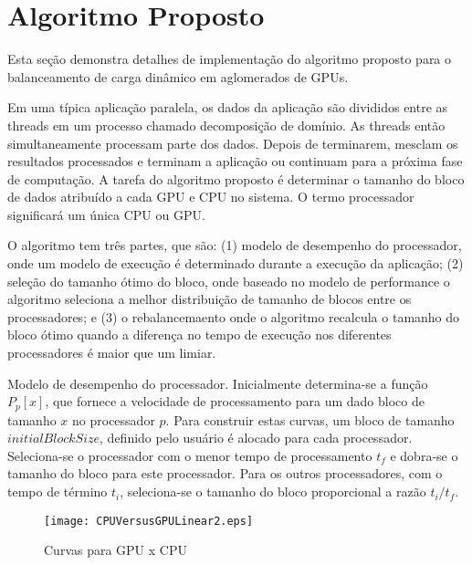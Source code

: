 \pagestyle{empty}
\cleardoublepage
\pagestyle{fancy}

\chapter{Algoritmo Proposto}\label{cap4}


Esta seção demonstra detalhes de implementação do algoritmo proposto para o balanceamento de carga dinâmico em aglomerados de GPUs. 

Em uma típica aplicação paralela, os dados da aplicação são divididos entre as threads em um processo chamado decomposição de domínio. As threads então simultaneamente processam parte dos dados. Depois de terminarem, mesclam os resultados processados e terminam a aplicação ou continuam para a próxima fase de computação. A tarefa do algoritmo proposto é determinar o tamanho do bloco de dados atribuído a cada GPU e CPU no sistema. O termo processador significará um única CPU ou GPU.

O algoritmo tem três partes, que são: (1) modelo de desempenho do processador, onde um modelo de execução é determinado durante a execução da aplicação; (2) seleção do tamanho ótimo do bloco, onde baseado no modelo de performance o algoritmo seleciona a melhor distribuição de tamanho de blocos entre os processadores; e (3) o rebalancemaento onde o algoritmo recalcula o tamanho do bloco ótimo quando a diferença no tempo de execução nos diferentes processadores é maior que um limiar.

Modelo de desempenho do processador. Inicialmente determina-se a função $P_p[x]$, que fornece a velocidade de processamento para um dado bloco de tamanho $x$ no processador $p$. Para construir estas curvas, um bloco de tamanho $initialBlockSize$, definido pelo usuário é alocado para cada processador. Seleciona-se o processador com o menor tempo de processamento $t_f$ e dobra-se o tamanho do bloco para este processador. Para os outros processadores, com o tempo de término $t_i$, seleciona-se o tamanho do bloco proporcional a razão $t_i/t_f$.


\begin{figure*}[htb]
	\begin{center}
	\centering
			\texttt{[image: CPUVersusGPULinear2.eps]}
	\caption{Curvas para GPU x CPU}
	\label{fig:CPUVersusGPU}
	\end{center}
\end{figure*}



